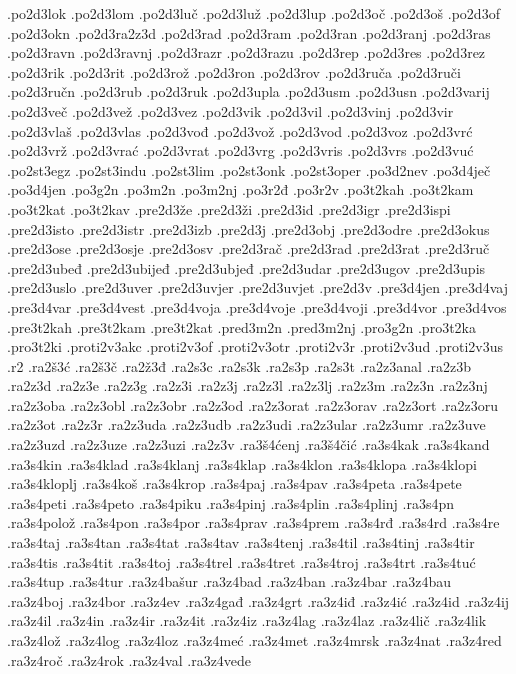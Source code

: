 {.po2d3lok
.po2d3lom
.po2d3luč
.po2d3luž
.po2d3lup
.po2d3oč
.po2d3oš
.po2d3of
.po2d3okn
.po2d3ra2z3d
.po2d3rad
.po2d3ram
.po2d3ran
.po2d3ranj
.po2d3ras
.po2d3ravn
.po2d3ravnj
.po2d3razr
.po2d3razu
.po2d3rep
.po2d3res
.po2d3rez
.po2d3rik
.po2d3rit
.po2d3rož
.po2d3ron
.po2d3rov
.po2d3ruča
.po2d3ruči
.po2d3ručn
.po2d3rub
.po2d3ruk
.po2d3upla
.po2d3usm
.po2d3usn
.po2d3varij
.po2d3več
.po2d3vež
.po2d3vez
.po2d3vik
.po2d3vil
.po2d3vinj
.po2d3vir
.po2d3vlaš
.po2d3vlas
.po2d3vođ
.po2d3vož
.po2d3vod
.po2d3voz
.po2d3vrć
.po2d3vrž
.po2d3vrać
.po2d3vrat
.po2d3vrg
.po2d3vris
.po2d3vrs
.po2d3vuć
.po2st3egz
.po2st3indu
.po2st3lim
.po2st3onk
.po2st3oper
.po3d2nev
.po3d4ječ
.po3d4jen
.po3g2n
.po3m2n
.po3m2nj
.po3r2đ
.po3r2v
.po3t2kah
.po3t2kam
.po3t2kat
.po3t2kav
.pre2d3že
.pre2d3ži
.pre2d3id
.pre2d3igr
.pre2d3ispi
.pre2d3isto
.pre2d3istr
.pre2d3izb
.pre2d3j
.pre2d3obj
.pre2d3odre
.pre2d3okus
.pre2d3ose
.pre2d3osje
.pre2d3osv
.pre2d3rač
.pre2d3rad
.pre2d3rat
.pre2d3ruč
.pre2d3ubeđ
.pre2d3ubijeđ
.pre2d3ubjeđ
.pre2d3udar
.pre2d3ugov
.pre2d3upis
.pre2d3uslo
.pre2d3uver
.pre2d3uvjer
.pre2d3uvjet
.pre2d3v
.pre3d4jen
.pre3d4vaj
.pre3d4var
.pre3d4vest
.pre3d4voja
.pre3d4voje
.pre3d4voji
.pre3d4vor
.pre3d4vos
.pre3t2kah
.pre3t2kam
.pre3t2kat
.pred3m2n
.pred3m2nj
.pro3g2n
.pro3t2ka
.pro3t2ki
.proti2v3akc
.proti2v3of
.proti2v3otr
.proti2v3r
.proti2v3ud
.proti2v3us
.r2
.ra2š3ć
.ra2š3č
.ra2ž3đ
.ra2s3c
.ra2s3k
.ra2s3p
.ra2s3t
.ra2z3anal
.ra2z3b
.ra2z3d
.ra2z3e
.ra2z3g
.ra2z3i
.ra2z3j
.ra2z3l
.ra2z3lj
.ra2z3m
.ra2z3n
.ra2z3nj
.ra2z3oba
.ra2z3obl
.ra2z3obr
.ra2z3od
.ra2z3orat
.ra2z3orav
.ra2z3ort
.ra2z3oru
.ra2z3ot
.ra2z3r
.ra2z3uda
.ra2z3udb
.ra2z3udi
.ra2z3ular
.ra2z3umr
.ra2z3uve
.ra2z3uzd
.ra2z3uze
.ra2z3uzi
.ra2z3v
.ra3š4ćenj
.ra3š4čić
.ra3s4kak
.ra3s4kand
.ra3s4kin
.ra3s4klad
.ra3s4klanj
.ra3s4klap
.ra3s4klon
.ra3s4klopa
.ra3s4klopi
.ra3s4kloplj
.ra3s4koš
.ra3s4krop
.ra3s4paj
.ra3s4pav
.ra3s4peta
.ra3s4pete
.ra3s4peti
.ra3s4peto
.ra3s4piku
.ra3s4pinj
.ra3s4plin
.ra3s4plinj
.ra3s4pn
.ra3s4polož
.ra3s4pon
.ra3s4por
.ra3s4prav
.ra3s4prem
.ra3s4rđ
.ra3s4rd
.ra3s4re
.ra3s4taj
.ra3s4tan
.ra3s4tat
.ra3s4tav
.ra3s4tenj
.ra3s4til
.ra3s4tinj
.ra3s4tir
.ra3s4tis
.ra3s4tit
.ra3s4toj
.ra3s4trel
.ra3s4tret
.ra3s4troj
.ra3s4trt
.ra3s4tuć
.ra3s4tup
.ra3s4tur
.ra3z4bašur
.ra3z4bad
.ra3z4ban
.ra3z4bar
.ra3z4bau
.ra3z4boj
.ra3z4bor
.ra3z4ev
.ra3z4gađ
.ra3z4grt
.ra3z4iđ
.ra3z4ić
.ra3z4id
.ra3z4ij
.ra3z4il
.ra3z4in
.ra3z4ir
.ra3z4it
.ra3z4iz
.ra3z4lag
.ra3z4laz
.ra3z4lič
.ra3z4lik
.ra3z4lož
.ra3z4log
.ra3z4loz
.ra3z4meć
.ra3z4met
.ra3z4mrsk
.ra3z4nat
.ra3z4red
.ra3z4roč
.ra3z4rok
.ra3z4val
.ra3z4vede
}
